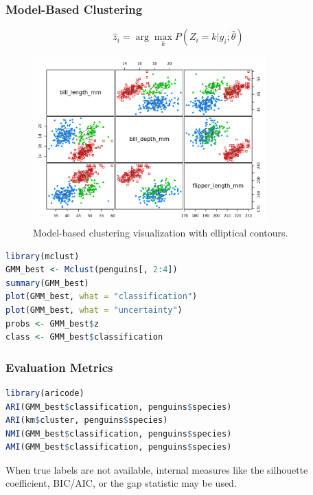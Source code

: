 \documentclass[11pt,a4paper]{article}
\begin{document}
\subsubsection{Model-Based Clustering}
\begin{equation}
\hat{z}_i = \arg\max_k P(Z_i = k | y_i; \hat{\theta})
\end{equation}

\begin{figure}[htb]
    \centering
    \includegraphics[width=0.8\textwidth]{model-based-clustering.png}
    \caption{Model-based clustering visualization with elliptical contours.}
    \label{fig:model-based-clustering}
\end{figure}
\begin{lstlisting}[language=R]
library(mclust)
GMM_best <- Mclust(penguins[, 2:4])
summary(GMM_best)
plot(GMM_best, what = "classification")
plot(GMM_best, what = "uncertainty")
probs <- GMM_best$z
class <- GMM_best$classification
\end{lstlisting}

\subsubsection{Evaluation Metrics}
\begin{lstlisting}[language=R]
library(aricode)
ARI(GMM_best$classification, penguins$species)
ARI(km$cluster, penguins$species)
NMI(GMM_best$classification, penguins$species)
AMI(GMM_best$classification, penguins$species)
\end{lstlisting}

\begin{notebox}
When true labels are not available, internal measures like the silhouette coefficient, BIC/AIC, or the gap statistic may be used.
\end{notebox}
\newpage
\end{document}
